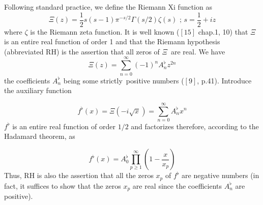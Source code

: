 \documentclass{article}
\begin{document}
Following standard practice, we define the Riemann Xi function as 
\begin{equation}
\Xi \left( z\right) =\dfrac{1}{2}s\left( s-1\right) \pi ^{-s/2}\Gamma \left(
s/2\right) \zeta \left( s\right) \text{ \ ; \ \ \ }s=\dfrac{1}{2}+iz
\end{equation}
where $\zeta $ is the Riemann zeta function. It is well known ($\left[ 15\right] $ chap.1, 10) that $\Xi $ is an entire real function of order 1 and
that the Riemann hypothesis (abbreviated RH) is the assertion that all zeros
of $\Xi $\ are real. We have 
\begin{equation}
\Xi \left( z\right) =\sum\limits_{n=0}^{\infty }\left( -1\right)
^{n}A_{n}^{\flat }z^{2n}
\end{equation}
the coefficients $A_{n}^{\flat }$ being some strictly\ positive numbers ($\left[ 9\right] $, p.41). Introduce the auxiliary function

\begin{equation}
f^{\flat }\left( x\right) =\Xi \left( -i\sqrt{x}\right) =\sum_{n=0}^{\infty
}A_{n}^{\flat }x^{n}
\end{equation}
$f^{\flat }$ is an entire real function of order $1/2$ and factorizes
therefore, according to the Hadamard theorem, as

\begin{equation}
f^{\flat }\left( x\right) =A_{0}^{\flat }\prod\limits_{p\geq 1}^{\infty
}\left( 1-\dfrac{x}{x_{p}}\right)
\end{equation}
Thus, RH is also the assertion that all the zeros $x_{p}$ of $f^{\flat }$
are negative numbers (in fact, it suffices to show that the zeros $x_{p}$
are real since the coefficients $A_{n}^{\flat }$ are positive).
\end{document}
